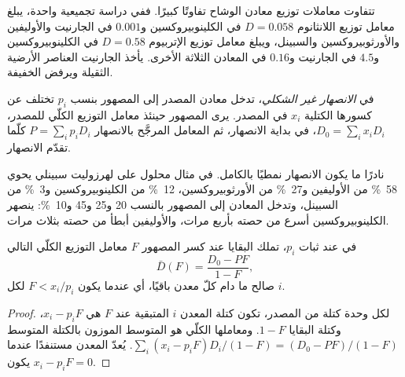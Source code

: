 تتفاوت معاملات توزيع معادن الوشاح تفاوتًا كبيرًا. ففي
دراسة تجميعية واحدة، يبلغ معامل توزيع اللانثانوم $D = 0.058$ في الكلينوبيروكسين و$0.001$ في
الجارنيت والأوليفين والأورثوبيروكسين والسبينل، ويبلغ معامل توزيع الإتربيوم $D = 0.58$ في
الكلينوبيروكسين و$4.5$ في الجارنيت و$0.16$ في المعادن الثلاثة الأخرى. يأخذ الجارنيت
العناصر الأرضية الثقيلة ويرفض الخفيفة.

\begin{definition}\label{def:b3:trace-element-modelling:nonmodal}
في \emph{الانصهار غير الشكلي}، تدخل معادن المصدر إلى
المصهور بنسب $p_i$ تختلف عن كسورها الكتلية
$x_i$ في المصدر. يرى المصهور حينئذ معامل التوزيع الكلّي
للمصدر، $D_0 = \sum_i x_iD_i$، في بداية الانصهار، ثم
المعامل المرجَّح بالانصهار $P = \sum_i p_iD_i$ كلّما تقدّم الانصهار.
\end{definition}

نادرًا ما يكون الانصهار نمطيًا بالكامل. في مثال محلول على لهرزوليت سبينلي
يحوي \qty{58}{\percent} من الأوليفين و\qty{27}{\percent} من الأورثوبيروكسين،
\qty{12}{\percent} من الكلينوبيروكسين و\qty{3}{\percent} من السبينل، وتدخل المعادن
إلى المصهور بالنسب 20 و25 و45 و\qty{10}{\percent}:
ينصهر الكلينوبيروكسين أسرع من حصته بأربع مرات، والأوليفين
أبطأ من حصته بثلاث مرات.

\begin{proposition}
\label{prop:b3:trace-element-modelling:residue}
في  عند ثبات $p_i$، تملك البقايا عند كسر المصهور $F$
معامل التوزيع الكلّي التالي
\[
\bar D(F) = \frac{D_0 - PF}{1 - F},
\]
صالح ما دام كلّ معدن باقيًا، أي عندما يكون $F < x_i/p_i$ لكل $i$.
\end{proposition}

\begin{proof}
لكل وحدة كتلة من المصدر، تكون كتلة المعدن $i$ المتبقية عند $F$ هي $x_i - p_iF$،
وكتلة البقايا $1 - F$. ومعاملها الكلّي هو المتوسط الموزون بالكتلة
المتوسط $\sum_i (x_i - p_iF)D_i/(1 - F) = (D_0 - PF)/(1 - F)$. يُعدّ المعدن مستنفدًا
عندما يكون $x_i - p_iF = 0$.
\end{proof}

